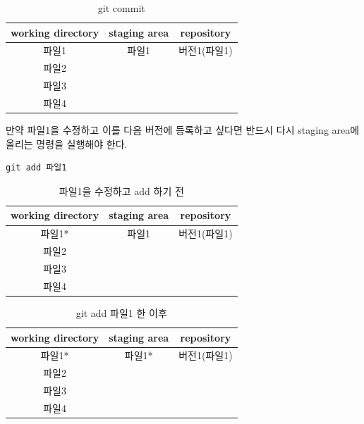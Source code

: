\documentclass[letterpaper,12pt]{article}
\begin{document}
\clearpage

\begin{table}[ht]
\begin{center}
\label{tbl:bins} %
\begin{tabular}{|ccc|} 
\hline
\multicolumn{1}{|c}{working directory} & \multicolumn{1}{c}{staging area} & repository\\
\hline
파일1 &   파일1 & 버전1(파일1)\\
파일2 &    & \\
파일3 &    & \\
파일4 &    & \\
\hline
\end{tabular}
\end{center}
\caption{git commit}
\end{table}
만약 파일1을 수정하고 이를 다음 버전에 등록하고 싶다면 반드시 다시 staging area에 올리는 명령을 실행해야 한다. 
\begin{verbatim}
git add 파일1
\end{verbatim}

\begin{table}[ht]
\begin{center}
\label{tbl:bins} %
\begin{tabular}{|ccc|} 
\hline
\multicolumn{1}{|c}{working directory} & \multicolumn{1}{c}{staging area} & repository\\
\hline
파일1* &   파일1 & 버전1(파일1)\\
파일2 &    & \\
파일3 &    & \\
파일4 &    & \\
\hline
\end{tabular}
\end{center}
\caption{파일1을 수정하고 add 하기 전}
\end{table}

\begin{table}[ht]
\begin{center}
\label{tbl:bins} %
\begin{tabular}{|ccc|} 
\hline
\multicolumn{1}{|c}{working directory} & \multicolumn{1}{c}{staging area} & repository\\
\hline
파일1* &   파일1* & 버전1(파일1)\\
파일2 &    & \\
파일3 &    & \\
파일4 &    & \\
\hline
\end{tabular}
\end{center}
\caption{git add 파일1 한 이후}
\end{table}
\end{document}

